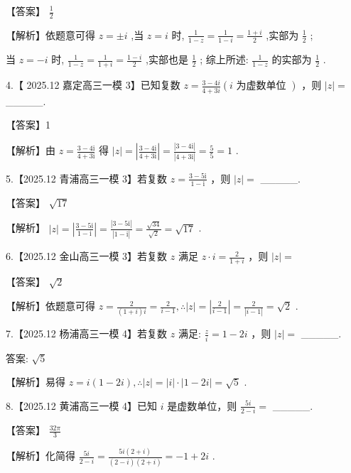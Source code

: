 \documentclass[10pt]{article}
\begin{document}
【答案】 \(\frac{1}{2}\)

【解析】依题意可得 \(z =  \pm  i\) ,当 \(z = i\) 时, \(\frac{1}{1 - z} = \frac{1}{1 - i} = \frac{1 + i}{2}\) ,实部为 \(\frac{1}{2}\) ;

当 \(z =  - i\) 时, \(\frac{1}{1 - z} = \frac{1}{1 + i} = \frac{1 - i}{2}\) ,实部也是 \(\frac{1}{2}\) ; 综上所述: \(\frac{1}{1 - z}\) 的实部为 \(\frac{1}{2}\) .

4.【 2025.12 嘉定高三一模 3】已知复数 \(z = \frac{3 - {4i}}{4 + {3i}}\left( {i\text{ 为虚数单位 }}\right)\) ，则 \(\left| z\right|  =\) \_\_\_\_\_.

【答案】1

【解析】由 \(z = \frac{3 - 4\mathrm{i}}{4 + 3\mathrm{i}}\) 得 \(\left| z\right|  = \left| \frac{3 - 4\mathrm{i}}{4 + 3\mathrm{i}}\right|  = \frac{\left| 3 - 4\mathrm{i}\right| }{\left| 4 + 3\mathrm{i}\right| } = \frac{5}{5} = 1\) .

5.【2025.12 青浦高三一模 3】若复数 \(z = \frac{3 - 5\mathrm{i}}{1 - \mathrm{i}}\) ，则 \(\left| z\right|  =\) \_\_\_\_\_.

【答案】 \(\sqrt{17}\)

【解析】 \(\left| z\right|  = \left| \frac{3 - 5\mathrm{i}}{1 - \mathrm{i}}\right|  = \frac{\left| 3 - 5\mathrm{i}\right| }{\left| 1 - \mathrm{i}\right| } = \frac{\sqrt{34}}{\sqrt{2}} = \sqrt{17}\) .

6.【2025.12 金山高三一模 3】若复数 \(z\) 满足 \(z \cdot  i = \frac{2}{1 + i}\) ，则 \(\left| z\right|  =\)

【答案】 \(\sqrt{2}\)

【解析】依题意可得 \(z = \frac{2}{\left( {1 + i}\right) i} = \frac{2}{i - 1},\therefore \left| z\right|  = \left| \frac{2}{i - 1}\right|  = \frac{2}{\left| i - 1\right| } = \sqrt{2}\) .

7.【2025.12 杨浦高三一模 4】若复数 \(z\) 满足: \(\frac{z}{i} = 1 - {2i}\) ，则 \(\left| z\right|  =\) \_\_\_\_\_.

答案: \(\sqrt{5}\)

【解析】易得 \(z = i\left( {1 - {2i}}\right) ,\therefore \left| z\right|  = \left| i\right|  \cdot  \left| {1 - {2i}}\right|  = \sqrt{5}\) .

8.【2025.12 黄浦高三一模 4】已知 \(i\) 是虚数单位，则 \(\frac{5i}{2 - i} =\) \_\_\_\_\_.

【答案】 \(\frac{32\pi }{3}\)

【解析】化简得 \(\frac{5i}{2 - i} = \frac{{5i}\left( {2 + i}\right) }{\left( {2 - i}\right) \left( {2 + i}\right) } =  - 1 + {2i}\) .
\end{document}
